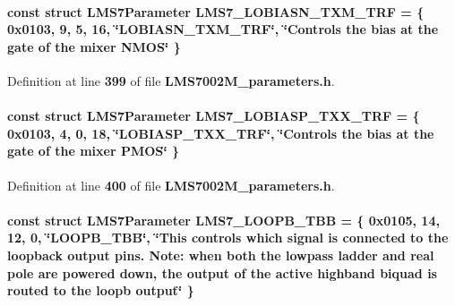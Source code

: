 \paragraph[{L\+M\+S7\+\_\+\+L\+O\+B\+I\+A\+S\+N\+\_\+\+T\+X\+M\+\_\+\+T\+RF}]{\setlength{\rightskip}{0pt plus 5cm}const struct {\bf L\+M\+S7\+Parameter} L\+M\+S7\+\_\+\+L\+O\+B\+I\+A\+S\+N\+\_\+\+T\+X\+M\+\_\+\+T\+RF = \{ 0x0103, 9, 5, 16, \char`\"{}\+L\+O\+B\+I\+A\+S\+N\+\_\+\+T\+X\+M\+\_\+\+T\+R\+F\char`\"{}, \char`\"{}\+Controls the bias at the gate of the mixer N\+M\+O\+S\char`\"{} \}\hspace{0.3cm}{\ttfamily [static]}}\label{LMS7002M__parameters_8h_a341f21e273897480f1f60f2e670a95a5}


Definition at line {\bf 399} of file {\bf L\+M\+S7002\+M\+\_\+parameters.\+h}.

\paragraph[{L\+M\+S7\+\_\+\+L\+O\+B\+I\+A\+S\+P\+\_\+\+T\+X\+X\+\_\+\+T\+RF}]{\setlength{\rightskip}{0pt plus 5cm}const struct {\bf L\+M\+S7\+Parameter} L\+M\+S7\+\_\+\+L\+O\+B\+I\+A\+S\+P\+\_\+\+T\+X\+X\+\_\+\+T\+RF = \{ 0x0103, 4, 0, 18, \char`\"{}\+L\+O\+B\+I\+A\+S\+P\+\_\+\+T\+X\+X\+\_\+\+T\+R\+F\char`\"{}, \char`\"{}\+Controls the bias at the gate of the mixer P\+M\+O\+S\char`\"{} \}\hspace{0.3cm}{\ttfamily [static]}}\label{LMS7002M__parameters_8h_a1f59bc1a6621c65772db23f65e046acb}


Definition at line {\bf 400} of file {\bf L\+M\+S7002\+M\+\_\+parameters.\+h}.

\paragraph[{L\+M\+S7\+\_\+\+L\+O\+O\+P\+B\+\_\+\+T\+BB}]{\setlength{\rightskip}{0pt plus 5cm}const struct {\bf L\+M\+S7\+Parameter} L\+M\+S7\+\_\+\+L\+O\+O\+P\+B\+\_\+\+T\+BB = \{ 0x0105, 14, 12, 0, \char`\"{}\+L\+O\+O\+P\+B\+\_\+\+T\+B\+B\char`\"{}, \char`\"{}\+This controls which signal is connected to the loopback output pins. Note\+: when both the lowpass ladder and real pole are powered down, the output of the active highband biquad is routed to the loopb output\char`\"{} \}\hspace{0.3cm}{\ttfamily [static]}}\label{LMS7002M__parameters_8h_a01c6ec1b31c5b12215ab6f27e6d62185}


